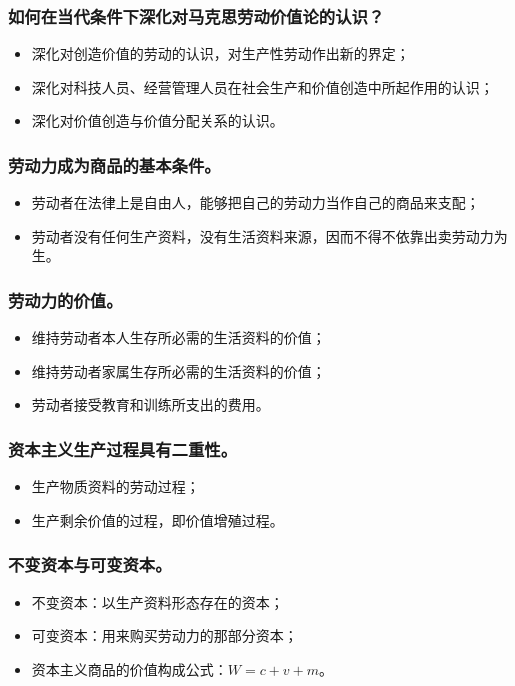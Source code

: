 \documentclass{article}
\begin{document}
\subsubsection{如何在当代条件下深化对马克思劳动价值论的认识？}
\begin{itemize}
    \item 深化对创造价值的劳动的认识，对生产性劳动作出新的界定；
    \item 深化对科技人员、经营管理人员在社会生产和价值创造中所起作用的认识；
    \item 深化对价值创造与价值分配关系的认识。
\end{itemize}

\subsubsection{劳动力成为商品的基本条件。}
\begin{itemize}
    \item 劳动者在法律上是自由人，能够把自己的劳动力当作自己的商品来支配；
    \item 劳动者没有任何生产资料，没有生活资料来源，因而不得不依靠出卖劳动力为生。
\end{itemize}

\subsubsection{劳动力的价值。}
\begin{itemize}
    \item 维持劳动者本人生存所必需的生活资料的价值；
    \item 维持劳动者家属生存所必需的生活资料的价值；
    \item 劳动者接受教育和训练所支出的费用。
\end{itemize}

\subsubsection{资本主义生产过程具有二重性。}
\begin{itemize}
    \item 生产物质资料的劳动过程；
    \item 生产剩余价值的过程，即价值增殖过程。
\end{itemize}

\subsubsection{不变资本与可变资本。}
\begin{itemize}
    \item 不变资本：以生产资料形态存在的资本；
    \item 可变资本：用来购买劳动力的那部分资本；
    \item 资本主义商品的价值构成公式：$W=c+v+m$。
\end{itemize}
\end{document}
